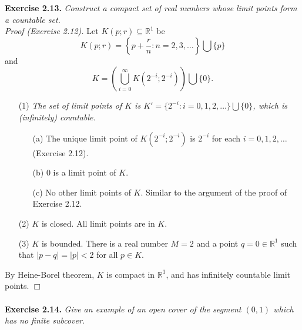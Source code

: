 \documentclass{article}
\begin{document}



\textbf{Exercise 2.13.}
\emph{Construct a compact set of real numbers whose limit points form a countable set.} \\

\emph{Proof (Exercise 2.12).}
Let $K(p;r) \subseteq \mathbb{R}^1$ be
$$K(p;r) = \left\{ p + \frac{r}{n} : n = 2, 3, \ldots \right\} \bigcup \{p\}$$
and
$$K
= \left(\bigcup_{i = 0}^{\infty} K(2^{-i};2^{-i})\right) \bigcup \{0\}.$$
\begin{enumerate}
\item[(1)]
\emph{The set of limit points of $K$ is $K' = \{ 2^{-i} : i = 0, 1, 2, \ldots \} \bigcup \{0\}$,
which is (infinitely) countable.}
  \begin{enumerate}
  \item[(a)]
  The unique limit point of $K(2^{-i};2^{-i})$ is $2^{-i}$ for each $i = 0, 1, 2, \ldots$
  (Exercise 2.12).
  \item[(b)]
  $0$ is a limit point of $K$.
  \item[(c)]
  No other limit points of $K$.
  Similar to the argument of the proof of Exercise 2.12.
  \end{enumerate}
\item[(2)]
$K$ is closed. All limit points are in $K$.
\item[(3)]
$K$ is bounded. There is a real number $M = 2$ and a point $q = 0 \in \mathbb{R}^1$
such that $|p - q| = |p| < 2$ for all $p \in K$.
\end{enumerate}
By Heine-Borel theorem, $K$ is compact in $\mathbb{R}^1$,
and has infinitely countable limit points.
$\Box$ \\\\






\textbf{Exercise 2.14.}
\emph{Give an example of an open cover of the segment $(0, 1)$
which has no finite subcover.} \\
\end{document}

